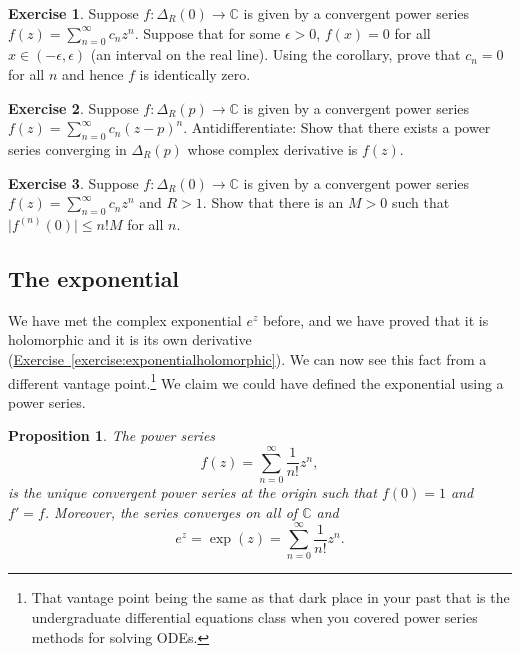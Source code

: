 \documentclass[12pt,openany]{book}
\newcommand{\sabs}[1]{\lvert {#1} \rvert}
\newcommand{\C}{{\mathbb{C}}}
\theoremstyle{plain}
\newtheorem{prop}[thm]{Proposition}
\theoremstyle{remark}
\theoremstyle{definition}
\newenvironment{exbox}{%
    \def\FrameCommand{\vrule width 1pt \relax\hspace{10pt}}%
    \MakeFramed{\advance\hsize-\width\FrameRestore}%
}{%
    \endMakeFramed
}
\theoremstyle{exercise}
\newtheorem{exercise}{Exercise}[section]
\theoremstyle{example}
\newcommand{\exerciseref}[1]{\hyperref[#1]{Exercise~\ref*{#1}}}
\begin{document}
\begin{exbox}
\begin{exercise}
Suppose $f \colon \Delta_R(0) \to \C$ is given by a convergent power
series
$f(z) = \sum_{n=0}^\infty c_n z^n$.
Suppose that for some $\epsilon > 0$, $f(x) = 0$ for all $x \in
(-\epsilon,\epsilon)$ (an interval on the real line).
Using the corollary,
prove that $c_n = 0$ for all $n$ and hence $f$ is identically zero.
\end{exercise}

\begin{exercise} \label{exercise:antiderseries}
Suppose $f \colon \Delta_R(p) \to \C$ is given by a convergent power
series
$f(z) = \sum_{n=0}^\infty c_n {(z-p)}^n$.
Antidifferentiate:
Show that there exists a power series converging in $\Delta_R(p)$
whose complex derivative is $f(z)$.
\end{exercise}

\begin{exercise} 
Suppose $f \colon \Delta_R(0) \to \C$ is given by a convergent power
series
$f(z) = \sum_{n=0}^\infty c_n {z}^n$ and $R > 1$.
Show that there is an $M>0$ such that
$\sabs{f^{(n)}(0)} \leq n! M$ for all $n$.
\end{exercise}
\end{exbox}

\subsection{The exponential}

We have met the complex exponential $e^z$ before, and we have proved
that it is holomorphic and it is its own derivative
(\exerciseref{exercise:exponentialholomorphic}).  We can now see this fact
from a different vantage point.\footnote{%
That vantage point being the same as that dark place in your past
that is the undergraduate differential equations class when you covered
power series methods for solving ODEs.}
We claim we could have defined the exponential
using a power series.

\begin{prop}
The power series
\begin{equation*}
f(z) = \sum_{n=0}^\infty \frac{1}{n!} z^n ,
\end{equation*}
is the unique convergent power series at the origin
such that $f(0)=1$ and $f'=f$.
Moreover, the series converges on all of $\C$ and
\begin{equation*}
e^z = \exp(z) = \sum_{n=0}^\infty \frac{1}{n!} z^n .
\end{equation*}
\end{prop}
\end{document}
